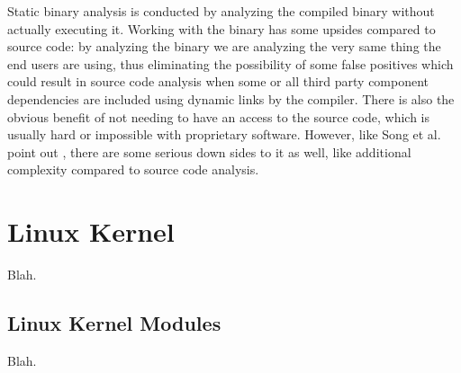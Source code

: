 Static binary analysis is conducted by analyzing the compiled binary without actually executing it.
Working with the binary has some upsides compared to source code: by analyzing the binary we are
analyzing the very same thing the end users are using, thus eliminating the possibility of some
false positives which could result in source code analysis when some or all third party component
dependencies are included using dynamic links by the compiler. There is also the obvious benefit of
not needing to have an access to the source code, which is usually hard or impossible with
proprietary software. However, like Song et al. point out \cite{song2008bitblaze}, there are some
serious down sides to it as well, like additional complexity compared to source code analysis.

\section{Linux Kernel}

Blah.

\subsection{Linux Kernel Modules}

Blah.


